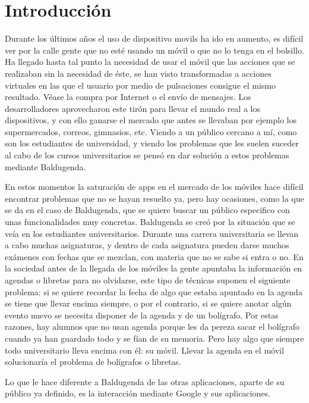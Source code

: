 \chapter{Introducción}

Durante los últimos años el uso de \glspl{dispositivo movil} ha ido en aumento, es difícil ver por la calle gente que no esté usando un móvil o que no lo tenga en el bolsillo. Ha llegado hasta tal punto la necesidad de usar el móvil que las acciones que se realizaban sin la necesidad de éste, se han visto transformadas a acciones virtuales en las que el usuario por medio de pulsaciones consigue el mismo resultado. Véase la compra por Internet o el envío de mensajes.
Los desarrolladores aprovecharon este tirón para llevar el mundo real a los dispositivos, y con ello ganarse el mercado que antes se llevaban por ejemplo los supermercados, correos, gimnasios, etc.
Viendo a un público cercano a mí, como son los estudiantes de universidad, y viendo los problemas que les suelen suceder al cabo de los cursos universitarios se pensó en dar solución a estos problemas mediante Baldugenda.

En estos momentos la saturación de  \acrshort{app}s en el mercado de los móviles hace difícil encontrar problemas que no se hayan resuelto ya, pero hay ocasiones, como la que se da en el caso de Baldugenda, que se quiere buscar un público especifico con unas funcionalidades muy concretas. Baldugenda se creó por la situación que se veía en los estudiantes universitarios. Durante una carrera universitaria se llevan a cabo muchas asignaturas, y dentro de cada asignatura pueden darse muchos exámenes con fechas que se mezclan, con materia que no se sabe si entra o no. En la sociedad antes de la llegada de los móviles la gente apuntaba la información en agendas o libretas para no olvidarse, este tipo de técnicas suponen el siguiente problema: si se quiere recordar la fecha de algo que estaba apuntado en la agenda se tiene que llevar encima siempre, o por el contrario, si se quiere anotar algún evento nuevo se necesita disponer de la agenda y de un bolígrafo. Por estas razones, hay alumnos que no usan agenda porque les da pereza sacar el bolígrafo cuando ya han guardado todo y se fían de su memoria. Pero hay algo que siempre todo universitario lleva encima con él: su móvil. Llevar la agenda en el móvil solucionaría el problema de bolígrafos o libretas. 

Lo que le hace diferente a Baldugenda de las otras aplicaciones, aparte de su público ya definido, es la interacción mediante Google y sus aplicaciones.

